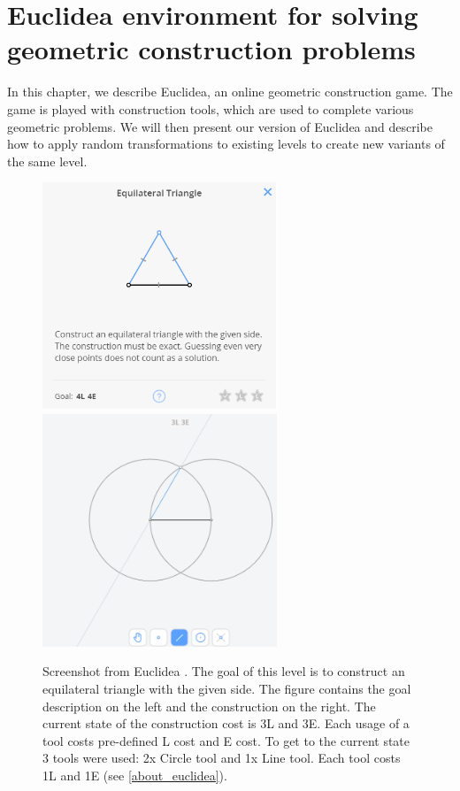 \chapter{Euclidea environment for solving geometric construction problems}
\label{euclidea_chapter}
In this chapter, we describe Euclidea, an online geometric construction game. The game is played with construction tools, which are used to complete various geometric problems. We will then present our version of Euclidea and describe how to apply random transformations to existing levels to create new variants of the same level.

\begin{figure}[h]
\centering
\includegraphics[width=70mm]{img/Actual_euclidea_definition.png}
\includegraphics[width=70mm]{img/Actual_euclidea_screen.png}
\caption{Screenshot from Euclidea \cite{euclidea}. The goal of this level is to construct an equilateral triangle with the given side. The figure contains the goal description on the left and the construction on the right. The current state of the construction cost is 3L and 3E. Each usage of a tool costs pre-defined L cost and E cost. To get to the current state 3 tools were used: 2x Circle tool and 1x Line tool. Each tool costs 1L and 1E (see \ref{about_euclidea}).}
\end{figure}
